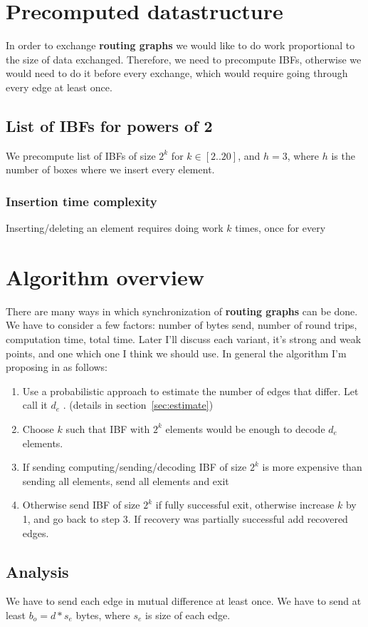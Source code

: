 \documentclass[11pt]{article}
\begin{document}
\section{Precomputed datastructure}
In order to exchange \textbf{routing graphs} we would like to do work proportional to the size of data exchanged.
Therefore, we need to precompute IBFs, otherwise we would need to do it before every exchange, which would require going through every edge at least once.
\subsection{List of IBFs for powers of 2}
We precompute list of IBFs of size $2^k$ for $k \in [2..20]$, and $h = 3$, where $h$ is the number of boxes where we insert every element.
\subsubsection{Insertion time complexity}
Inserting/deleting an element requires doing work $k$ times, once for every


\section{Algorithm overview}
There are many ways in which synchronization of \textbf{routing graphs} can be done.
We have to consider a few factors: number of bytes send, number of round trips, computation time, total time.
Later I'll discuss each variant, it's strong and weak points, and one which one I think we should use.
In general the algorithm I'm proposing in as follows:
\begin{enumerate}
  \item Use a probabilistic approach to estimate the number of edges that differ.
  Let call it $d_e$ . (details in section~\ref{sec:estimate})
  \item Choose $k$ such that IBF with $2^k$ elements would be enough to decode $d_e$ elements.
  \item If sending computing/sending/decoding IBF of size $2^k$ is more expensive than sending all elements, send all elements and exit
  \item Otherwise send IBF of size $2^k$ if fully successful exit, otherwise increase $k$ by 1, and go back to step 3.
 If recovery was partially successful add recovered edges.
\end{enumerate}
\subsection{Analysis}
We have to send each edge in mutual difference at least once.
We have to send at least $b_o = d*s_e$ bytes, where $s_e$ is size of each edge.
\end{document}
